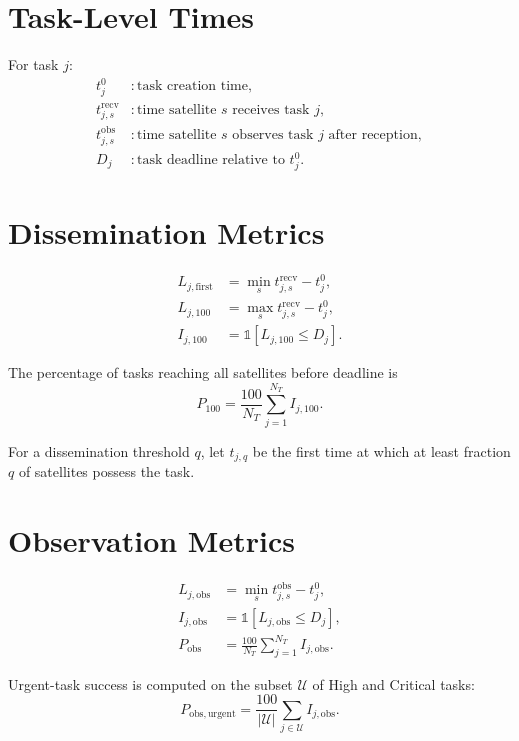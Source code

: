 \section{Task-Level Times}

For task $j$:
\begin{align*}
t_j^0 &: \text{task creation time},\\
t_{j,s}^{\mathrm{recv}} &: \text{time satellite $s$ receives task $j$},\\
t_{j,s}^{\mathrm{obs}} &: \text{time satellite $s$ observes task $j$ after reception},\\
D_j &: \text{task deadline relative to }t_j^0.
\end{align*}

\section{Dissemination Metrics}

\begin{align}
L_{j,\mathrm{first}} &= \min_s t_{j,s}^{\mathrm{recv}} - t_j^0,\\
L_{j,100} &= \max_s t_{j,s}^{\mathrm{recv}} - t_j^0,\\
I_{j,100} &= \mathbb{1}\left[L_{j,100}\leq D_j\right].
\end{align}

The percentage of tasks reaching all satellites before deadline is
\begin{equation}
P_{100} = \frac{100}{N_T}\sum_{j=1}^{N_T}I_{j,100}.
\end{equation}

For a dissemination threshold $q$, let $t_{j,q}$ be the first time at which at least fraction $q$ of satellites possess the task.

\section{Observation Metrics}

\begin{align}
L_{j,\mathrm{obs}} &= \min_s t_{j,s}^{\mathrm{obs}} - t_j^0,\\
I_{j,\mathrm{obs}} &= \mathbb{1}\left[L_{j,\mathrm{obs}}\leq D_j\right],\\
P_{\mathrm{obs}} &= \frac{100}{N_T}\sum_{j=1}^{N_T}I_{j,\mathrm{obs}}.
\end{align}

Urgent-task success is computed on the subset $\mathcal{U}$ of High and Critical tasks:
\begin{equation}
P_{\mathrm{obs,urgent}} = \frac{100}{|\mathcal{U}|}
\sum_{j\in\mathcal{U}} I_{j,\mathrm{obs}}.
\end{equation}

